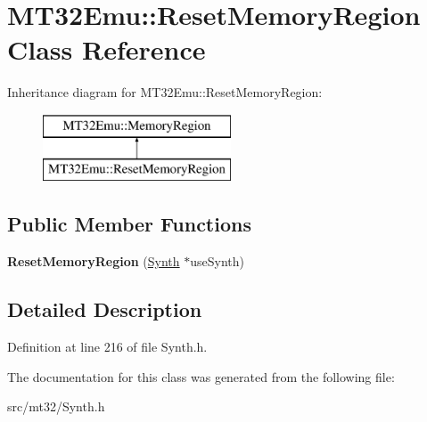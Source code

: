 \hypertarget{classMT32Emu_1_1ResetMemoryRegion}{\section{M\-T32\-Emu\-:\-:Reset\-Memory\-Region Class Reference}
\label{classMT32Emu_1_1ResetMemoryRegion}
}
Inheritance diagram for M\-T32\-Emu\-:\-:Reset\-Memory\-Region\-:\begin{figure}[H]
\begin{center}
\leavevmode
\includegraphics[height=2.000000cm]{classMT32Emu_1_1ResetMemoryRegion}
\end{center}
\end{figure}
\subsection*{Public Member Functions}
\begin{DoxyCompactItemize}
\item 
\hypertarget{classMT32Emu_1_1ResetMemoryRegion_ae9d4e560e36b6ff696076a62c9cb0fc6}{{\bfseries Reset\-Memory\-Region} (\hyperlink{classMT32Emu_1_1Synth}{Synth} $\ast$use\-Synth)}\label{classMT32Emu_1_1ResetMemoryRegion_ae9d4e560e36b6ff696076a62c9cb0fc6}

\end{DoxyCompactItemize}


\subsection{Detailed Description}


Definition at line 216 of file Synth.\-h.



The documentation for this class was generated from the following file\-:\begin{DoxyCompactItemize}
\item 
src/mt32/Synth.\-h\end{DoxyCompactItemize}
